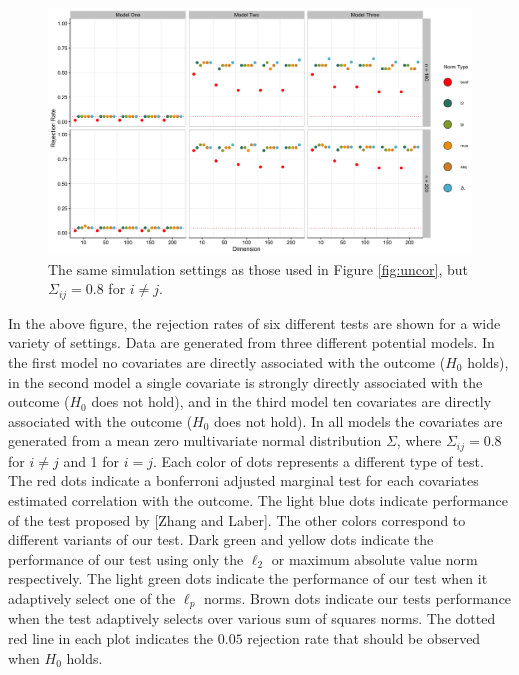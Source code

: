 \documentclass{article}
\begin{document}
\begin{figure}[]
	\centering
\includegraphics[width = \linewidth]{lots_cor.jpg}
	\caption{The same simulation settings as those used in Figure \ref{fig:uncor}, but $\Sigma_{ij} = 0.8$ for $i \neq j$.}
	\label{fig:lotscor}
\end{figure}


In the above figure, the rejection rates of six different tests are shown for a wide variety of settings.  Data are generated from three different potential models.  In the first model no covariates are directly associated with the outcome ($H_0$ holds), in the second model a single covariate is strongly directly associated with the outcome ($H_0$ does not hold), and in the third model ten covariates are directly associated with the outcome ($H_0$ does not hold).  In all models the covariates are generated from a mean zero multivariate normal distribution $\Sigma$, where $\Sigma_{ij} = 0.8$ for $i \neq j$ and 1 for $i = j$.  Each color of dots represents a different type of test.  The red dots indicate a bonferroni adjusted marginal test for each covariates estimated correlation with the outcome. The light blue dots indicate performance of the test proposed by [Zhang and Laber]. The other colors correspond to different variants of our test. Dark green and yellow dots indicate the performance of our test using only the $\ell_2$ or maximum absolute value norm respectively.  The light green dots indicate the performance of our test when it adaptively select one of the $\ell_p$ norms. Brown dots indicate our tests performance when the test adaptively selects over various sum of squares norms. The dotted red line in each plot indicates the $0.05$ rejection rate that should be observed when $H_0$ holds.  
\end{document}
